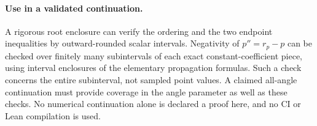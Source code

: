 \documentclass[11pt]{article}
\begin{document}
\paragraph{Use in a validated continuation.}
A rigorous root enclosure can verify the ordering and the two endpoint inequalities by outward-rounded scalar intervals. Negativity of $p''=r_p-p$ can be checked over finitely many subintervals of each exact constant-coefficient piece, using interval enclosures of the elementary propagation formulas. Such a check concerns the entire subinterval, not sampled point values. A claimed all-angle continuation must provide coverage in the angle parameter as well as these checks. No numerical continuation alone is declared a proof here, and no CI or Lean compilation is used.
\end{document}
